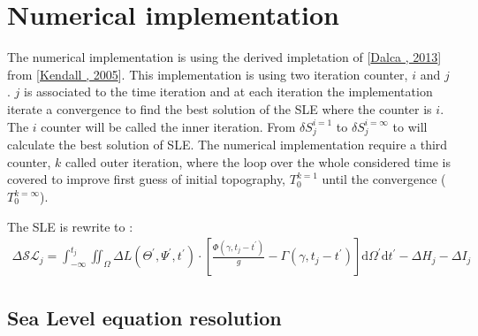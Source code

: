 \documentclass[letterpaper,10pt,english]{sphinxmanual}
\begin{document}
\section{Numerical implementation}
\label{\detokenize{numerical_imp:numerical-implementation}}\label{\detokenize{numerical_imp::doc}}
\noindent{}
\label{\detokenize{numerical_imp:iteration-desc}}
\sphinxAtStartPar
The numerical implementation is using the derived impletation of {[}\hyperlink{cite.index:id3}{Dalca , 2013}{]} from {[}\hyperlink{cite.index:id5}{Kendall , 2005}{]}. This implementation is using two iteration counter, \(i\) and \(j\). \(j\) is associated to the time iteration and at each iteration the implementation iterate a convergence to find the best solution of the SLE where the counter is \(i\). The \(i\) counter will be called the inner iteration. From \(\delta S^{i=1}_j\) to \(\delta S^{i=\infty}_j\) to will calculate the best solution of SLE. The numerical implementation require a third counter, \(k\) called outer iteration, where the loop over the whole considered time is covered to improve first guess of initial topography, \(T_0^{k=1}\) until the convergence (\(T_0^{k=\infty}\)).

\sphinxAtStartPar
The SLE is rewrite to :
\begin{equation*}
\begin{split}\Delta \mathcal{SL}_j = \int_{-\infty}^{t_j} \iint_\Omega \Delta L (\Theta ^\prime, \Psi ^\prime,t ^\prime) \cdot [\frac{\Phi(\gamma, t_j - t^\prime)}{g} - \Gamma(\gamma,t_j-t^\prime)] \mathrm{d} \Omega ^\prime \mathrm{d} t^\prime - \Delta H_j - \Delta I_j\end{split}
\end{equation*}

\subsection{Sea Level equation resolution}
\label{\detokenize{numerical_imp:sea-level-equation-resolution}}
\end{document}
